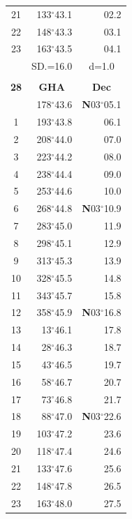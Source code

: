 \documentclass[10pt, a4paper]{report}
\begin{document}
\begin{scriptsize}
\begin{tabular*}{0.2\textwidth}[t]{@{\extracolsep{\fill}}|c|rr|}
21 & 133$^\circ$43.1 & \raisebox{0.24ex}{\boldmath$\cdot$~\boldmath$\cdot$~~}02.2\\
22 & 148$^\circ$43.3 & 03.1\\
23 & 163$^\circ$43.5 & 04.1\\
\hline
\rule{0pt}{2.4ex} & \multicolumn{1}{c}{SD.=16.0} & \multicolumn{1}{c|}{d=1.0}\\
\hline
\multicolumn{1}{c}{}\\[-0.5ex]\hline
\multicolumn{1}{|c|}{\rule{0pt}{2.6ex}\textbf{28}} & \multicolumn{1}{c}{\textbf{GHA}} & \multicolumn{1}{c|}{\textbf{Dec}}\\
\hline\rule{0pt}{2.6ex}\noindent
0 & 178$^\circ$43.6 & \textbf{N}03$^\circ$05.1\\
1 & 193$^\circ$43.8 & 06.1\\
2 & 208$^\circ$44.0 & 07.0\\
3 & 223$^\circ$44.2 & \raisebox{0.24ex}{\boldmath$\cdot$~\boldmath$\cdot$~~}08.0\\
4 & 238$^\circ$44.4 & 09.0\\
5 & 253$^\circ$44.6 & 10.0\\[2Pt]
6 & 268$^\circ$44.8 & \textbf{N}03$^\circ$10.9\\
7 & 283$^\circ$45.0 & 11.9\\
8 & 298$^\circ$45.1 & 12.9\\
9 & 313$^\circ$45.3 & \raisebox{0.24ex}{\boldmath$\cdot$~\boldmath$\cdot$~~}13.9\\
10 & 328$^\circ$45.5 & 14.8\\
11 & 343$^\circ$45.7 & 15.8\\[2Pt]
12 & 358$^\circ$45.9 & \textbf{N}03$^\circ$16.8\\
13 & 13$^\circ$46.1 & 17.8\\
14 & 28$^\circ$46.3 & 18.7\\
15 & 43$^\circ$46.5 & \raisebox{0.24ex}{\boldmath$\cdot$~\boldmath$\cdot$~~}19.7\\
16 & 58$^\circ$46.7 & 20.7\\
17 & 73$^\circ$46.8 & 21.7\\[2Pt]
18 & 88$^\circ$47.0 & \textbf{N}03$^\circ$22.6\\
19 & 103$^\circ$47.2 & 23.6\\
20 & 118$^\circ$47.4 & 24.6\\
21 & 133$^\circ$47.6 & \raisebox{0.24ex}{\boldmath$\cdot$~\boldmath$\cdot$~~}25.6\\
22 & 148$^\circ$47.8 & 26.5\\
23 & 163$^\circ$48.0 & 27.5\\

\end{tabular*}
\end{scriptsize}
\end{document}
